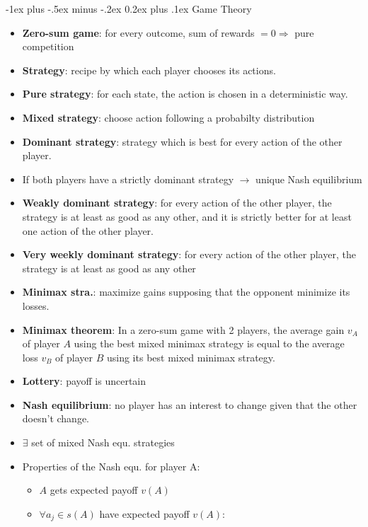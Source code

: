 \documentclass[10pt,a4paper,landscape]{article}
\makeatletter
\renewcommand{\section}{\@startsection{section}{1}{0mm}%
                                {-1ex plus -.5ex minus -.2ex}%
                                {0.2ex plus .1ex}%
                                {\normalfont\tiny\bfseries}}
\makeatother
\begin{document}
\begin{multicols*}{5}

\section{Game Theory}
\begin{itemize}
	\item \textbf{Zero-sum game}: for every outcome, sum of rewards $= 0 \Rightarrow$ pure competition
	\item \textbf{Strategy}: recipe by which each player chooses its actions.
	\item \textbf{Pure strategy}: for each state, the action is chosen in a deterministic way.
	\item \textbf{Mixed strategy}: choose action following a probabilty distribution
	\item \textbf{Dominant strategy}: strategy which is best for every action of the other player.
	\item If both players have a strictly dominant strategy $\rightarrow$ unique Nash equilibrium
	\item \textbf{Weakly dominant strategy}: for every action of the other player, the strategy is at least as good as any other, and it is strictly better for at least one action of the other player.
	\item \textbf{Very weekly dominant strategy}: for every action of the other player, the strategy is at least as good as any other
	\item \textbf{Minimax stra.}: maximize gains supposing that the opponent minimize its losses.
	\item \textbf{Minimax theorem}: In a zero-sum game with 2 players, the average gain $v_A$ of player $A$ using the best mixed minimax strategy is equal to the average loss $v_B$ of player $B$ using its best mixed minimax strategy.
	\item \textbf{Lottery}: payoff is uncertain
\end{itemize}
\begin{itemize}
	\item \textbf{Nash equilibrium}: no player has an interest to change given that the other doesn't change.
	\item $\exists$ set of mixed Nash equ. strategies
	\item Properties of the Nash equ. for player A:
	\begin{itemize}
		\item $A$ gets expected payoff $v(A)$
		\item $\forall a_j \in s(A)$ have expected payoff $v(A)$:

\end{itemize}
\end{itemize}
\end{multicols*}
\end{document}
